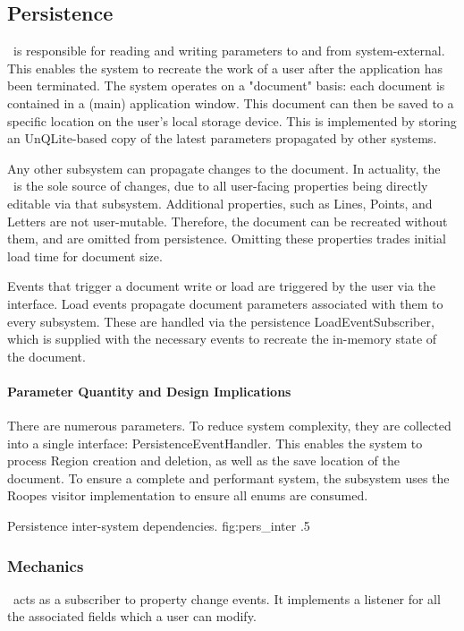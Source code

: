 \subsection{Persistence}
\permod\ is responsible for reading and writing parameters to and from system-external.
This enables the system to recreate the work of a user after the application has been terminated.
The system operates on a "document" basis: each document is contained in a (main) application window.
This document can then be saved to a specific location on the user's local storage device.
This is implemented by storing an UnQLite-based copy of the latest parameters propagated by other systems.

Any other subsystem can propagate changes to the document.
In actuality, the \uimod\ is the sole source of changes, due to all user-facing properties being directly editable via that subsystem.
Additional properties, such as Lines, Points, and Letters are not user-mutable.
Therefore, the document can be recreated without them, and are omitted from persistence.
Omitting these properties trades initial load time for document size.

Events that trigger a document write or load are triggered by the user via the interface.
Load events propagate document parameters associated with them to every subsystem.
These are handled via the persistence LoadEventSubscriber, which is supplied with the necessary events to recreate the in-memory state of the document.

\paragraph{Parameter Quantity and Design Implications}
There are numerous parameters.
To reduce system complexity, they are collected into a single interface: PersistenceEventHandler.
This enables the system to process Region creation and deletion, as well as the save location of the document.
To ensure a complete and performant system, the subsystem uses the Roopes visitor implementation to ensure all enums are consumed.

{Persistence inter-system dependencies.}
{fig:pers_inter}
{.5}


\subsubsection{Mechanics}
\perftype\ acts as a subscriber to property change events.
It implements a listener for all the associated fields which a user can modify.

